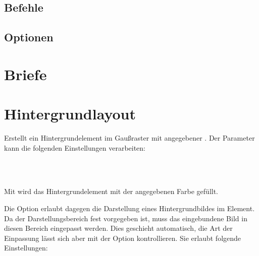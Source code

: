 \documentclass[a4paper,11pt]{tubsreprt}
\begin{document}
\section{Befehle}

\section{Optionen}


\chapter{Briefe}



\chapter{Hintergrundlayout}

\begin{Declaration}
\end{Declaration}

\begin{Declaration}
\end{Declaration}

\begin{Declaration}
\end{Declaration}

\begin{Declaration}
\end{Declaration}

Erstellt ein Hintergrundelement im Gaußraster mit angegebener .
Der Parameter  kann die folgenden Einstellungen verarbeiten:

\begin{Declaration}
  \\
  \\
\end{Declaration}

Mit  wird das Hintergrundelement mit der angegebenen
Farbe gefüllt.

Die Option  erlaubt dagegen die Darstellung
eines Hintergrundbildes im Element.
Da der Darstellungsbereich fest vorgegeben ist, muss das eingebundene Bild
in diesen Bereich eingepasst werden. Dies geschieht automatisch, die Art
der Einpassung lässt sich aber mit der Option  kontrollieren.
Sie erlaubt folgende Einstellungen:
\end{document}
